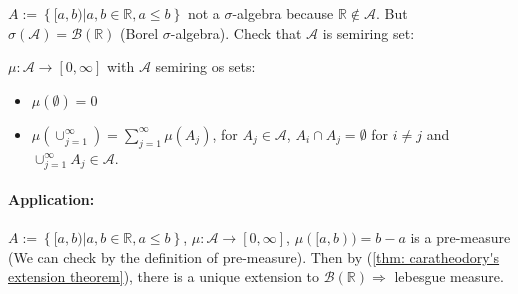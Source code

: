 \documentclass[../../note.tex]{subfiles}
\begin{document}
\begin{example}
    $A:= \left\{[a,b) \vert a,b \in \mathbb{R}, a\leq b\right\}$ not a $\sigma$-algebra because $\mathbb{R} \notin \mathcal{A}$. But $\sigma(\mathcal{A}) = \mathcal{B}(\mathbb{R})$ (Borel $\sigma$-algebra). Check that $\mathcal{A}$ is semiring set:
    \begin{itemize}
        \item $\emptyset \in \mathcal{A}$ 
        \item 
        \begin{align}
            [a,b) \cap [c,d) 
            &= \left\{
                \begin{matrix}
                    \emptyset,&~b \leq c, d \leq a \\
                    [c,b),&~c \in [a,b), d \notin[a,b) \\
                    \cdots &
                \end{matrix}
            \right.
        \end{align}
        \item         
        \begin{align}
            [a,b) \backslash [c,d) 
            &= \left\{
                \begin{matrix}
                    [a,b),&~d \leq a, b \leq c \\
                    [a,c),&~c \in [a,b), d \notin[a,b) \\
                    [a,c) \cup [d,b),&~c>a, d<b \\
                    \cdots &
                \end{matrix}
            \right.
        \end{align}
    \end{itemize}
\end{example}

\begin{definition}
    $\mu: \mathcal{A} \rightarrow [0,\infty]$ with $\mathcal{A}$ semiring os sets:
    \begin{itemize}
        \item $\mu(\emptyset) = 0$
        \item $\mu(\cup_{j=1}^{\infty}) = \sum_{j=1}^{\infty} \mu(A_j)$, for $A_j \in \mathcal{A}$, $A_i \cap A_j = \emptyset$ for $i \neq j$ and $\cup_{j=1}^{\infty} A_j \in \mathcal{A}$.
    \end{itemize}
\end{definition}

\paragraph{Application:}
$A:= \left\{[a,b) \vert a,b \in \mathbb{R}, a\leq b\right\}$, $\mu: \mathcal{A} \rightarrow [0,\infty]$, $\mu([a,b)) = b - a$ is a pre-measure (We can check by the definition of pre-measure). Then by (\ref{thm: caratheodory's extension theorem}), there is a unique extension to $\mathcal{B}(\mathbb{R}) \Longrightarrow$ lebesgue measure.
\end{document}
